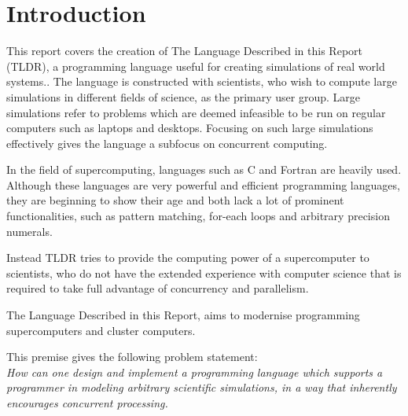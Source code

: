 \chapter{Introduction}\label{part:introduction}
\label{problemSatement}
This report covers the creation of The Language Described in this Report (TLDR), a programming language useful for creating simulations of real world systems.. The language is constructed with scientists, who wish to compute large simulations in different fields of science, as the primary user group. Large simulations refer to problems which are deemed infeasible to be run on regular computers such as laptops and desktops. Focusing on such large simulations effectively gives the language a subfocus on concurrent computing.

In the field of supercomputing, languages such as C and Fortran are heavily used. Although these languages  are very powerful and efficient programming languages, they are beginning to show their age and both lack a lot of prominent functionalities, such as pattern matching, for-each loops and arbitrary precision numerals. 

Instead TLDR tries to provide the computing power of a supercomputer to scientists, who do not have the extended experience with computer science that is required to take full advantage of concurrency and parallelism.

The Language Described in this Report, aims to modernise programming supercomputers and cluster computers.

This premise gives the following problem statement:
\\

\emph{How can one design and implement a programming language which supports a programmer in modeling arbitrary scientific simulations, in a way that inherently encourages concurrent processing.}

